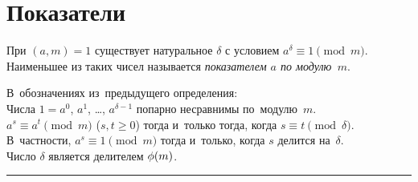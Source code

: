
\section*{Показатели}


\begingroup \def\eulerphi{\mathrm{\phi}}

При $(a, m) = 1$ существует натуральное $\delta$ с условием
\(
    a^{\delta} \equiv 1 \pmod{m}
\).
Наименьшее из таких чисел называется \emph{показателем $a$ по модулю~$m$}.

\begin{problems}

\item
В~обозначениях из~предыдущего определения:
\\
\subproblem
Числа $1 = a^0$, $a^1$, \ldots, $a^{\delta-1}$ попарно несравнимы
по~модулю~$m$.
\\
\subproblem
$a^s \equiv a^t \pmod{m}$ ($s, t \geq 0$)
тогда и~только тогда, когда
$s \equiv t \pmod{\delta}$.
В~частности, $a^s \equiv 1 \pmod{m}$
тогда и~только, когда
$s$ делится на~$\delta$.
\\
\subproblem
Число $\delta$ является делителем $\eulerphi(m)$.

\end{problems}

\medskip
\hrule

